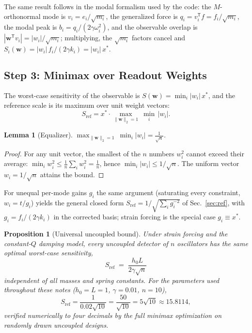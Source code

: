 \documentclass[11pt, letterpaper]{article}
\newcommand{\refsys}{\mathrm{ref}}
\newtheorem{lemma}{Lemma}
\newtheorem{proposition}{Proposition}
\begin{document}
The same result follows in the modal formalism used by the code: the
$M$-orthonormal mode is $v_i = e_i/\sqrt{m_i}$, the generalized force is
$q_i = v_i^{\mathsf T} f = f_i/\sqrt{m_i}$, the modal peak is
$b_i = q_i / (2\gamma\omega_i^2)$, and the observable overlap is
$|\mathbf{w}^{\mathsf T} v_i| = |w_i|/\sqrt{m_i}$; multiplying, the
$\sqrt{m_i}$ factors cancel and
$S_i(\mathbf{w}) = |w_i|\, f_i/(2\gamma k_i) = |w_i|\, x^{*}$.

\subsection{Step 3: Minimax over Readout Weights}

The worst-case sensitivity of the observable is
$S(\mathbf{w}) = \min_i |w_i|\, x^{*}$, and the reference scale is its
maximum over unit weight vectors:
\begin{equation}
  S_{\refsys}
  = x^{*} \cdot \max_{\|\mathbf{w}\|_2 = 1}\ \min_i\, |w_i|.
\end{equation}

\begin{lemma}[Equalizer]
\label{lem:equalizer}
$\displaystyle \max_{\|\mathbf{w}\|_2 = 1}\ \min_i |w_i| =
\frac{1}{\sqrt{n}}$.
\end{lemma}

\begin{proof}
For any unit vector, the smallest of the $n$ numbers $w_i^2$ cannot
exceed their average:
$\min_i w_i^2 \le \tfrac{1}{n}\sum_i w_i^2 = \tfrac{1}{n}$, hence
$\min_i |w_i| \le 1/\sqrt{n}$.  The uniform vector $w_i = 1/\sqrt{n}$
attains the bound.
\end{proof}

For unequal per-mode gains $g_i$ the same argument (saturating every
constraint, $w_i = t/g_i$) yields the general closed form
$S_{\refsys} = 1/\sqrt{\sum_i g_i^{-2}}$ of Sec.~\ref{sec:ref}, with
$g_i = f_i/(2\gamma k_i)$ in the corrected basis; strain forcing is the
special case $g_i \equiv x^{*}$.

\begin{proposition}[Universal uncoupled bound]
\label{prop:universal-bound}
Under strain forcing and the constant-$Q$ damping model, every uncoupled
detector of $n$ oscillators has the same optimal worst-case sensitivity,
\begin{equation}
  \boxed{\;
  S_{\refsys} \;=\; \frac{h_0 L}{2\gamma\sqrt{n}}
  \;}
  \label{eq:universal-bound}
\end{equation}
independent of all masses and spring constants.  For the parameters used
throughout these notes ($h_0 = L = 1$, $\gamma = 0.01$, $n = 10$),
\begin{equation}
  S_{\refsys} = \frac{1}{0.02\sqrt{10}} = \frac{50}{\sqrt{10}}
  = 5\sqrt{10} \approx 15.8114,
\end{equation}
verified numerically to four decimals by the full minimax optimization on
randomly drawn uncoupled designs.
\end{proposition}
\end{document}
